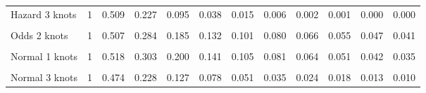 \documentclass[
]{article}
\begin{document}
\begin{table}[H]
{\begin{tabular}[t]{lrrrrrrrrrrr}
Hazard 3 knots & 1 & 0.509 & 0.227 & 0.095 & 0.038 & 0.015 & 0.006 & 0.002 & 0.001 & 0.000 & 0.000\\
\cellcolor{gray!10}{Odds 1 knots} & \cellcolor{gray!10}{1} & \cellcolor{gray!10}{0.533} & \cellcolor{gray!10}{0.326} & \cellcolor{gray!10}{0.227} & \cellcolor{gray!10}{0.171} & \cellcolor{gray!10}{0.135} & \cellcolor{gray!10}{0.111} & \cellcolor{gray!10}{0.093} & \cellcolor{gray!10}{0.080} & \cellcolor{gray!10}{0.070} & \cellcolor{gray!10}{0.062}\\
Odds 2 knots & 1 & 0.507 & 0.284 & 0.185 & 0.132 & 0.101 & 0.080 & 0.066 & 0.055 & 0.047 & 0.041\\
\cellcolor{gray!10}{Odds 3 knots} & \cellcolor{gray!10}{1} & \cellcolor{gray!10}{0.473} & \cellcolor{gray!10}{0.229} & \cellcolor{gray!10}{0.135} & \cellcolor{gray!10}{0.090} & \cellcolor{gray!10}{0.065} & \cellcolor{gray!10}{0.049} & \cellcolor{gray!10}{0.039} & \cellcolor{gray!10}{0.032} & \cellcolor{gray!10}{0.026} & \cellcolor{gray!10}{0.022}\\
Normal 1 knots & 1 & 0.518 & 0.303 & 0.200 & 0.141 & 0.105 & 0.081 & 0.064 & 0.051 & 0.042 & 0.035\\
\cellcolor{gray!10}{Normal 2 knots} & \cellcolor{gray!10}{1} & \cellcolor{gray!10}{0.514} & \cellcolor{gray!10}{0.297} & \cellcolor{gray!10}{0.193} & \cellcolor{gray!10}{0.135} & \cellcolor{gray!10}{0.100} & \cellcolor{gray!10}{0.076} & \cellcolor{gray!10}{0.059} & \cellcolor{gray!10}{0.048} & \cellcolor{gray!10}{0.039} & \cellcolor{gray!10}{0.032}\\
Normal 3 knots & 1 & 0.474 & 0.228 & 0.127 & 0.078 & 0.051 & 0.035 & 0.024 & 0.018 & 0.013 & 0.010\\
\bottomrule
\end{tabular}}
\end{table}
\end{document}
